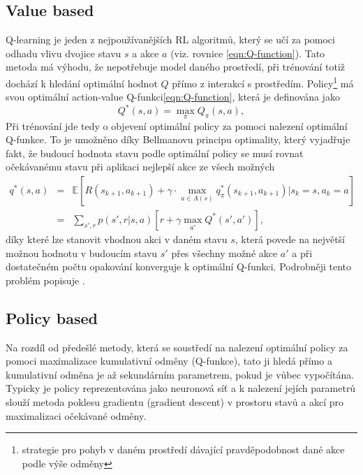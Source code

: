 \documentclass[czech, bc, kky, he, iso690numb]{fasthesis}
\begin{document}
            \subsection{Value based}
	            Q-learning je jeden z nejpoužívanějších RL algoritmů, který se učí za pomoci odhadu vlivu dvojice stavu \(s\) a akce \(a\) (viz. rovnice \ref{eqn:Q-function}). Tato metoda má výhodu, že nepotřebuje model daného prostředí, při trénování totiž dochází k hledání optimální hodnot \(Q\) přímo z interakcí s prostředím. Policy\footnote{strategie pro pohyb v daném prostředí dávající pravděpodobnost dané akce podle výše odměny} má svou optimální action-value Q-funkci\ref{eqn:Q-function}, která je definována jako
	                \begin{equation}
	                    Q^{*}(s,a)= \max_{\pi}Q_{\pi}(s,a),
	                \end{equation}
	            Při trénování jde tedy o objevení optimální policy za pomoci nalezení optimální Q-funkce. To je umožněno díky Bellmanovu principu optimality, který vyjadřuje fakt, že budoucí hodnota stavu podle optimální policy se musí rovnat očekávanému stavu při aplikaci nejlepší akce ze všech možných
	                \begin{eqnarray}
	                	q^{*}(s,a)&=&\mathbb{E}[R(s_{k+1},a_{k+1}) + \gamma\cdot\max_{a \in A(s)}q_{\pi}^{*}(s_{k+1},a_{k+1}) | s_{k} = s, a_{k} = a]\\
	                	&=& \sum_{s', r}p(s', r|s, a)\left[r+\gamma\max_{a'}Q^{*}(s',a')\right],
	                \end{eqnarray}      
	            díky které lze stanovit vhodnou akci v daném stavu \(s\), která povede na největší možnou hodnotu v budoucím stavu \(s'\) přes všechny možné akce \(a'\) a při dostatečném počtu opakování konverguje k optimální Q-funkci. Podrobněji tento problém popisuje \cite[p.~63]{RLbook}.  
            \subsection{Policy based}
	            Na rozdíl od předešlé metody, která se soustředí na nalezení optimální policy za pomoci maximalizace kumulativní odměny (Q-funkce), tato ji hledá přímo a kumulativní odměna je až sekundárním parametrem, pokud je vůbec vypočítána. Typicky je policy reprezentována jako neuronová síť a k nalezení jejích parametrů slouží metoda poklesu gradientu (gradient descent) v prostoru stavů a akcí pro maximalizaci očekávané odměny.
	            
\end{document}
